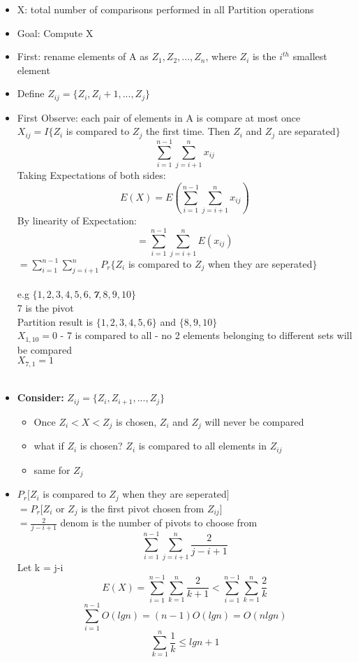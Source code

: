 \documentclass{article}
\begin{document}
	\begin{itemize}
		\item X: total number of comparisons performed in all Partition operations
		\item Goal: Compute X
		\item First: rename elements of A as $Z_1, Z_2, ..., Z_n$, where $Z_i$ is the $i^{th}$ smallest element
		\item Define $Z_{ij} = \{Z_i, Z_i+1,...,Z_j\}$
		\item First Observe: each pair of elements in A is compare at most once\\
		$X_{ij} = I\{Z_i$ is compared to $Z_j$ the first time. Then $Z_i$ and $Z_j$ are separated$\}$
		$$\sum_{i=1}^{n-1}\sum_{j=i+1}^{n}x_{ij}$$
		Taking Expectations of both sides:
		$$E(X) = E(\sum_{i=1}^{n-1}\sum_{j=i+1}^{n}x_{ij})$$
		By linearity of Expectation:
		$$ = \sum_{i=1}^{n-1}\sum_{j=i+1}^{n}E(x_{ij})$$
		$ = \sum_{i=1}^{n-1}\sum_{j=i+1}^{n}P_r\{Z_i$ is compared to $Z_j$ when they are seperated$\}$\\\\
		e.g $\{1, 2, 3, 4, 5, 6, $\textbf{\emph{7}}$, 8, 9, 10\}$\\
		7 is the pivot\\
		Partition result is $\{1, 2, 3, 4, 5, 6\}$ and $\{8, 9, 10\}$\\
		$X_{1,10} = 0$ - 7 is compared to all - no 2 elements belonging to different sets will be compared\\
		$X_{7,1} = 1$\\\\
		\item \textbf{Consider: }$Z_{ij} = \{Z_i, Z_{i+1}, ..., Z_j\}$\\
		\begin{itemize}
			\item Once $Z_i < X < Z_j$ is chosen, $Z_i$ and $Z_j$ will never be compared\\
			\item what if $Z_i$ is chosen? $Z_i$ is compared to all elements in $Z_{ij}$
			\item same for $Z_j$
		\end{itemize}
		\item $P_r[Z_i$ is compared to $Z_j$ when they are seperated$]$\\
		$= P_r[Z_i$ or $Z_j$ is the first pivot chosen from $Z_{ij}]$\\
		$= \frac{2}{j-i+1}$ denom is the number of pivots to choose from\\
		$$\sum_{i=1}^{n-1}\sum_{j=i+1}^{n}\frac{2}{j-i+1}$$
		Let k = j-i
		$$E(X) = \sum_{i=1}^{n-1}\sum_{k=1}^{n} \frac{2}{k+1} < \sum_{i=1}^{n-1}\sum_{k=1}^{n} \frac{2}{k}$$
		$$ \sum_{i=1}^{n-1} O(lg n) = (n-1)O(lgn) = O(nlgn)$$
		$$\sum_{k=1}^{n}\frac{1}{k} \le lgn + 1$$
	\end{itemize}
\end{document}
